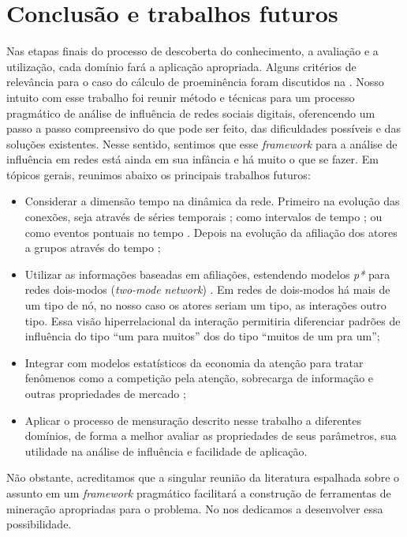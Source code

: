 \chapter{Conclusão e trabalhos futuros}
\label{ch:conclusao}

Nas etapas finais do processo de descoberta do conhecimento, a avaliação e a
utilização, cada domínio fará a aplicação apropriada. Alguns critérios de
relevância para o caso do cálculo de proeminência foram discutidos na
. Nosso intuito com esse trabalho foi reunir método e
técnicas para um processo pragmático de análise de influência de redes sociais
digitais, oferencendo um passo a passo compreensivo do que pode ser feito, das
dificuldades possíveis e das soluções existentes. Nesse sentido, sentimos que
esse \emph{framework} para a análise de influência em redes está ainda em sua
infância e há muito o que se fazer. Em tópicos gerais, reunimos abaixo os
principais trabalhos futuros:

\begin{itemize}
  \item Considerar a dimensão tempo na dinâmica da rede. Primeiro na
  evolução das conexões, seja através de séries temporais \citep{Snijders1996};
  como intervalos de tempo \citep{Butts2004}; ou como eventos pontuais no tempo
  \citep{Butts2008a}. Depois na evolução da afiliação dos atores a grupos
  através do tempo \citep{Berger-Wolf2006};
  \item Utilizar as informações baseadas em afiliações, estendendo
  modelos \emph{p*} para redes dois-modos (\emph{two-mode network})
  \citep{Field2006}. Em redes de dois-modos há mais de um tipo de nó, no nosso
  caso os atores seriam um tipo, as interações outro tipo. Essa visão
  hiperrelacional da interação permitiria diferenciar padrões de influência do
  tipo ``um para muitos'' dos do tipo ``muitos de um pra um'';
  \item Integrar com modelos estatísticos da economia da atenção para tratar
  fenômenos como a competição pela atenção, sobrecarga de informação e outras
  propriedades de mercado \citep{Falkinger2007}; 
  \item Aplicar o processo de mensuração descrito nesse trabalho a diferentes
  domínios, de forma a melhor avaliar as propriedades de seus parâmetros, sua
  utilidade na análise de influência e facilidade de aplicação.
\end{itemize}

Não obstante, acreditamos que a singular reunião da literatura espalhada sobre
o assunto em um \emph{framework} pragmático facilitará a construção de
ferramentas de mineração apropriadas para o problema. No  nos
dedicamos a desenvolver essa possibilidade.
